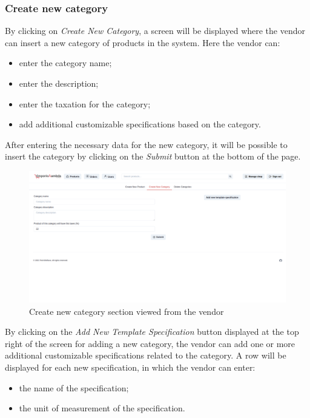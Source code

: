 \subsubsection{Create new category}
By clicking on \textit{Create New Category}, a screen will be displayed where the vendor can insert a new category of products in the system. Here the vendor can:
\begin{itemize}
    \item enter the category name;
    \item enter the description;
    \item enter the taxation for the category;
    \item add additional customizable specifications based on the category.
\end{itemize}
After entering the necessary data for the new category, it will be possible to insert the category by clicking on the \textit{Submit} button at the bottom of the page.
\begin{figure}[!ht]
    \caption{Create new category section viewed from the vendor}
    \vspace{5px}
    \includegraphics[scale=0.25]{../../../../Images/userManual/createNewCategoryVendor.png}
    \centering
\end{figure}
By clicking on the \textit{Add New Template Specification} button displayed at the top right of the screen for adding a new category, the vendor can add one or more additional customizable specifications related to the category.
\linebreak
A row will be displayed for each new specification, in which the vendor can enter:
\begin{itemize}
    \item the name of the specification;
    \item the unit of measurement of the specification.
\end{itemize}
